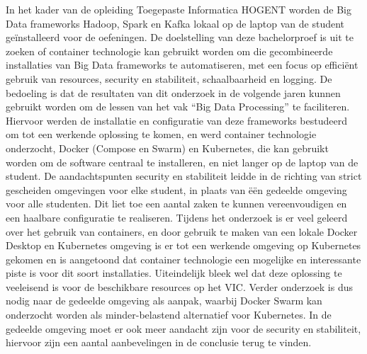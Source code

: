 In het kader van de opleiding Toegepaste Informatica HOGENT worden de Big Data frameworks Hadoop, Spark en Kafka lokaal op de laptop van de student geïnstalleerd voor de oefeningen.
De doelstelling van deze bachelorproef is uit te zoeken of container technologie kan gebruikt worden om die gecombineerde installaties van Big Data frameworks te automatiseren, met een focus op efficiënt gebruik van resources, security en stabiliteit, schaalbaarheid en logging. De bedoeling is dat de resultaten van dit onderzoek in de volgende jaren kunnen gebruikt worden om de lessen van het vak ``Big Data Processing'' te faciliteren.
\newline
Hiervoor werden de installatie en configuratie van deze frameworks bestudeerd om tot een werkende oplossing te komen, en werd container technologie onderzocht, Docker (Compose en Swarm) en Kubernetes, die kan gebruikt worden om de software centraal te installeren, en niet langer op de laptop van de student.
\newline
De aandachtspunten security en stabiliteit leidde in de richting van strict gescheiden omgevingen voor elke student, in plaats van ëën gedeelde omgeving voor alle studenten. Dit liet toe een aantal zaken te kunnen vereenvoudigen en een haalbare configuratie te realiseren.
\newline
Tijdens het onderzoek is er veel geleerd over het gebruik van containers, en door gebruik te maken van een lokale Docker Desktop en Kubernetes omgeving is er tot een werkende omgeving op Kubernetes gekomen en is aangetoond dat container technologie een mogelijke en interessante piste is voor dit soort installaties.
\newline
Uiteindelijk bleek wel dat deze oplossing te veeleisend is voor de beschikbare resources op het VIC. Verder onderzoek is dus nodig naar de gedeelde omgeving als aanpak, waarbij Docker Swarm kan onderzocht worden als minder-belastend alternatief voor Kubernetes. In de gedeelde omgeving moet er ook meer aandacht zijn voor de security en stabiliteit, hiervoor zijn een aantal aanbevelingen in de conclusie terug te vinden.
\newline
\newline
